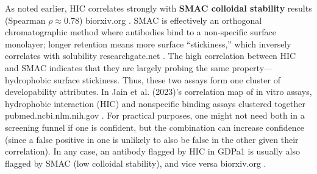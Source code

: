 \documentclass[12pt]{article}
\begin{document}
As noted earlier, HIC correlates strongly with \textbf{SMAC colloidal stability} results (Spearman $\rho\approx0.78$)
biorxiv.org
. SMAC is effectively an orthogonal chromatographic method where antibodies bind to a non-specific surface monolayer; longer retention means more surface “stickiness,” which inversely correlates with solubility
researchgate.net
. The high correlation between HIC and SMAC indicates that they are largely probing the same property—hydrophobic surface stickiness. Thus, these two assays form one cluster of developability attributes. In Jain et al. (2023)’s correlation map of in vitro assays, hydrophobic interaction (HIC) and nonspecific binding assays clustered together
pubmed.ncbi.nlm.nih.gov
. For practical purposes, one might not need both in a screening funnel if one is confident, but the combination can increase confidence (since a false positive in one is unlikely to also be false in the other given their correlation). In any case, an antibody flagged by HIC in GDPa1 is usually also flagged by SMAC (low colloidal stability), and vice versa
biorxiv.org
.
\end{document}
